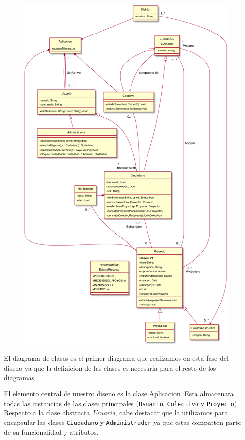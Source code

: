 \documentclass[12pt]{article}
\begin{document}
\begin{figure}[h!]
    \centering
    \includegraphics[scale=0.41]{Images/diagram_class.pdf}
    \vspace{+10pt}
\end{figure}
\newpage
El diagrama de clases es el primer diagrama que realizamos en esta fase del diseno ya que la definicion de las clases es necesaria para el resto de los diagramas
\par
El elemento central de nuestro diseno es la clase Aplicacion. Esta almacenara todas las instancias de las clases principales (\texttt{Usuario}, \texttt{Colectivo} y \texttt{Proyecto}). Respecto a la clase abstracta \textit{Usuario}, cabe destacar que la utilizamos para encapsular las clases \texttt{Ciudadano} y \texttt{Administrador} ya que estas comparten parte de su funcionalidad y atributos. 
\end{document}
